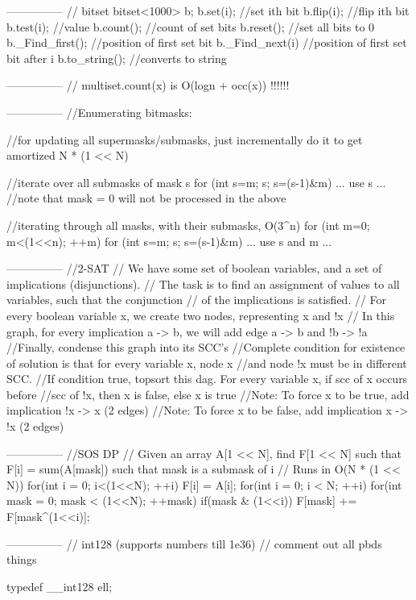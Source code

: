 ---------------
// bitset
bitset<1000> b;
b.set(i);       //set ith bit
b.flip(i);      //flip ith bit
b.test(i);      //value
b.count();      //count of set bits
b.reset();      //set all bits to 0
b._Find_first();    //position of first set bit
b._Find_next(i)      //position of first set bit after i
b.to_string();      //converts to string

---------------
// multiset.count(x) is O(logn + occ(x)) !!!!!!

---------------
//Enumerating bitmasks:

//for updating all supermasks/submasks, just incrementally do it to get amortized N * (1 << N)

//iterate over all submasks of mask s
for (int s=m; s; s=(s-1)&m)
    ... use s ...
//note that mask = 0 will not be processed in the above

//iterating through all masks, with their submasks, O(3^n)
for (int m=0; m<(1<<n); ++m)
    for (int s=m; s; s=(s-1)&m)
        ... use s and m ...

---------------
//2-SAT
// We have some set of boolean variables, and a set of implications (disjunctions).
// The task is to find an assignment of values to all variables, such that the conjunction 
// of the implications is satisfied.
// For every boolean variable x, we create two nodes, representing x and !x 
// In this graph, for every implication a -> b, we will add edge a -> b and !b -> !a
//Finally, condense this graph into its SCC's
//Complete condition for existence of solution is that for every variable x, node x
//and node !x must be in different SCC.
//If condition true, topsort this dag. For every variable x, if scc of x occurs before 
//scc of !x, then x is false, else x is true
//Note: To force x to be true, add implication !x -> x (2 edges)
//Note: To force x to be false, add implication x -> !x (2 edges)

---------------
//SOS DP
// Given an array A[1 << N], find F[1 << N] such that F[i] = sum(A[mask]) such that mask is a submask of i
// Runs in O(N * (1 << N))
for(int i = 0; i<(1<<N); ++i)
	F[i] = A[i];
for(int i = 0; i < N; ++i) 
    for(int mask = 0; mask < (1<<N); ++mask)
	    if(mask & (1<<i))
		    F[mask] += F[mask^(1<<i)];

---------------
// int128 (supports numbers till 1e36)
// comment out all pbds things

typedef __int128 ell;

